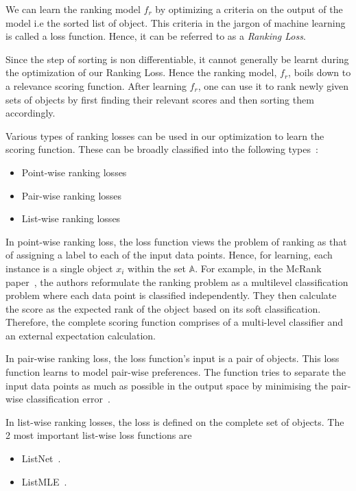 \documentclass[12pt, twoside, ngerman]{report}
\begin{document}
We can learn the ranking model $f_r$ by optimizing a criteria on the output of the model i.e the sorted list of object.
This criteria in the jargon of machine learning is called a loss function.
Hence,  it can be referred to as a \textit{Ranking Loss}.

Since the step of sorting is non differentiable,  it cannot generally be learnt during the optimization of our Ranking Loss.
Hence the ranking model,  $f_r$,  boils down to a relevance scoring function.
After learning $f_r$,  one can use it to rank newly given sets of objects by first finding their relevant scores and then sorting them accordingly.

Various types of ranking losses can be used in our optimization to learn the scoring function.
These can be broadly classified into the following types~\cite{RankingLossFirstPaperRead}:
\begin{itemize}
\item  Point-wise ranking losses
\item  Pair-wise ranking losses
\item  List-wise ranking losses
\end{itemize}

In point-wise ranking loss,  the loss function views the problem of ranking as that of assigning a label to each of the input data points.
Hence,  for learning,  each instance is a single object $x_i$ within the set $\mathbb{A}$.
For example,  in the McRank paper~\cite{McRank},  the authors reformulate the ranking problem as a multilevel classification problem where each data point is classified independently.
They then calculate the score as the expected rank of the object based on its soft classification.
Therefore, the complete scoring function comprises of a multi-level classifier and an external expectation calculation.

In pair-wise ranking loss,  the loss function's input is a pair of objects.
This loss function learns to model pair-wise preferences.
The function tries to separate the input data points as much as possible in the output space by minimising the pair-wise classification error~\cite{pairwisepreferencespaper}.

In list-wise ranking losses,  the loss is defined on the complete set of objects.
The 2 most important list-wise loss functions are
\begin{itemize}
\item ListNet~\cite{listwisebetter}.
\item ListMLE~\cite{listmlepaper}.
\end{itemize}
\end{document}

